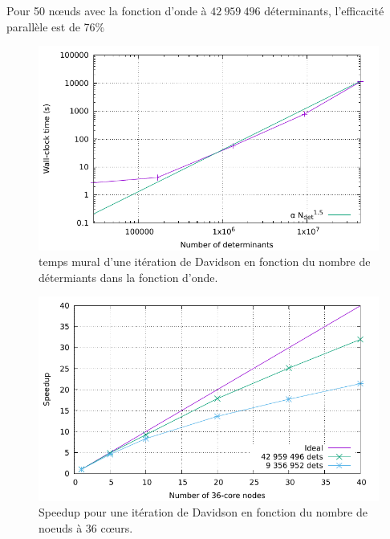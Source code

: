 \documentclass[./thesis.tex]{subfiles}
\begin{document}
Pour 50 nœuds avec la fonction d'onde à $42~959~496$ déterminants, l'efficacité parallèle est de 76\%

\begin{figure}[h!]
    \begin{center}
      \includegraphics[width=0.80\columnwidth]{figures/perf/scaling_davidson_ndet}
      \caption{temps mural d'une itération de Davidson en fonction du nombre de détermiants dans la fonction d'onde.}
      \label{fig:speedup_davidson_ndet_fr}
    \end{center}
\end{figure}
\begin{figure}[h!]
    \begin{center}
      \includegraphics[width=0.80\columnwidth]{figures/perf/scaling_davidson}
      \caption{Speedup pour une itération de Davidson en fonction du nombre de noeuds à 36 cœurs.}
      \label{fig:speedup_davidson_fr}
    \end{center}
\end{figure}
\end{document}
